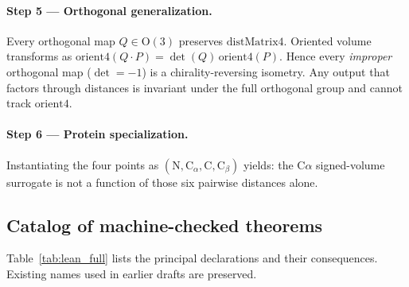 \documentclass[11pt]{article}
\begin{document}
\paragraph{Step 5 --- Orthogonal generalization.}
Every orthogonal map $Q\in\mathrm{O}(3)$ preserves $\mathrm{distMatrix4}$. Oriented volume transforms as $\mathrm{orient4}(Q\cdot P)=\det(Q)\,\mathrm{orient4}(P)$. Hence every \emph{improper} orthogonal map ($\det=-1$) is a chirality-reversing isometry. Any output that factors through distances is invariant under the full orthogonal group and cannot track $\mathrm{orient4}$.

\paragraph{Step 6 --- Protein specialization.}
Instantiating the four points as $(\mathrm{N},\mathrm{C}_\alpha,\mathrm{C},\mathrm{C}_\beta)$ yields: the C$\alpha$ signed-volume surrogate is not a function of those six pairwise distances alone.

\subsection{Catalog of machine-checked theorems}

Table~\ref{tab:lean_full} lists the principal declarations and their consequences. Existing names used in earlier drafts are preserved.
\end{document}
